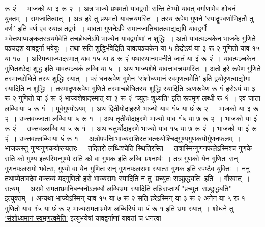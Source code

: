 \documentclass[11pt, openany]{book}
\begin{document}
\newpage

\begin{sloppypar}
\noindent रू २ं~। भाजको या ३ रू २~। अत्र भाज्ये प्रथमतो यावद्वर्गाः सन्ति तेभ्यो यावत् वर्गाणामेव शोधनं युक्तम्~। समजातित्वात्~। अत्र हरे तु प्रथमतो यावत्त्रयमस्ति~। तस्य रूपेण गुणने \hyperref[3.26]{'स्याद्रूपवर्णाभिहतौ तु वर्णः'} इति वर्ण एव स्यान्न तद्वर्गः~। यावता गुणनेऽपि समानजातिघातत्वाद्यद्यपि यावद्वर्गो भवेत्तथाप्यङ्कतस्त्रयमेवेति तच्छोधनेऽपि भाज्येन यावद्वर्गाणां न शुद्धिः~। अतो यावत्पञ्चकेन भाजके गुणिते पञ्चदश यावद्वर्गा भवेयुः~। तथा सति शुद्धिर्भवेदिति यावत्पञ्चकेन या ५ छेदोऽयं या ३ रू २ गुणितो याव १५ या १०~। अस्मिन्भाज्यादस्मात् याव १५ या ७ रू २ं यथास्थानमपनीते जातं या ३ं रू २ं~। यावत्पञ्चकेन गुणितश्छेदः शुद्ध इति यावत्पञ्चकं लब्धिः\textendash \,या ५~। अथ भाज्यशेषे यावत्तावत्त्रयमस्ति~। अतो हरे रूपेण गुणिते तस्माच्छोधिते तस्य शुद्धिः स्यात्~। परं धनरूपेण गुणेन \hyperref[1.7]{'संशोध्यमानं स्वमृणत्वमेति'} इति द्वयोरृणत्वाद्योगः स्यादिति न शुद्धिः~। तस्मादृणरूपेण गुणिते तस्माच्छोधितस्य शुद्धिः स्यादिति ऋणरूपेण रू १ं हरोऽयं या ३ रू २ गुणितो या ३ं रू २ं भाज्यशेषादस्मात् या ३ं रू २ं 'च्युतः शुध्यति' इति रूपमृणं लब्धी रू १ं~। एवं जाता लब्धिः\textendash \,या ५ रू १ं~। पूर्वगुण्योऽयम्~। अथ द्वितीयोदाहरणे भाज्यो याव १ं५ या ७ं रू २~। भाजको या ३ रू २~। उक्तवज्जाता लब्धिः\textendash \,या ५ रू १~। अथ तृतीयोदाहरणे भाज्यो याव १ं५ या ७ रू २~। भाजको या ३ं रू २ं~। उक्तवल्लब्धिः\textendash \,या ५ रू १ं~। अथ चतुर्थोदाहरणे भाज्यो याव १५ या ७ रू २ं~। भाजको या ३ं रू २ं~। उक्तवल्लब्धिः\textendash \,या ५ं रू १~। अत्रोपपत्तिः\textendash \,भाज्यराशिस्तावत्कयोश्चिद्गुण्यगुणकयोर्गुणनफलम्~। भाजकस्तु गुण्यगुणकयोरन्यतरः~। तदितरो लब्धिश्चेति स्थितिरस्ति~। तत्रास्मिन्गुणनफलेऽस्मिंश्च गुणके सति को गुण्य इत्यस्मिन्गुण्ये सति को वा गुणक इति लब्धिः प्रश्नार्थः~। तत्र गुणको येन गुणितः सन् गुणनफलसमो भवेत्स, गुण्यो वा येन गुणितः सन् गुणनफलसमः स्यात्स गुणक इति स्पष्टैव युक्तिः~। ननु तथाप्येतावदेव वक्तव्यं यद्गुणितो हरो भाज्यसमः स्यादिति न तु \hyperref[3.29]{'प्रच्युतः सञ्छुद्ध्यति'} इति~। गौरवात्~। सत्यम्~। असमे समताभ्रमनिबन्धनोऽलब्धौ लब्धिभ्रमः स्यादिति तन्निराप्तार्थं \hyperref[3.29]{"प्रच्युतः सञ्छुद्ध्यति"} इत्युक्तम्~। अन्यथा भाज्येऽस्मिन् याव १५ या ७ रू २ सति हरेऽस्मिन् या ३ रू २ अनेन या ५ रू १ गुणितो याव १ं५ या ७ं रू २ भाज्यसमताभ्रमेण लब्धिरियं या ५ं रू १ इति भ्रमः स्यात्~। शोधने तु \hyperref[1.7]{'संशोध्यमानं स्वमृणत्वमेति'} इत्युभयेषां यावद्वर्गाणां यावतां च धनत्वा-
\end{sloppypar}

\newpage
\end{document}
